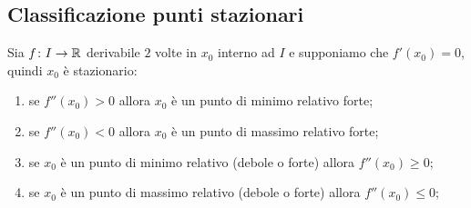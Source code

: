 \documentclass[a4paper]{article}
\begin{document}

\subsection{Classificazione punti stazionari}

\begin{snippettheorem}{}
    Sia \(f\colon I \to \mathbb{R}\) derivabile \(2\) volte in \(x_0\) interno ad \(I\)
    e supponiamo che \(f'(x_0) = 0\), quindi \(x_0\) è stazionario:
    \begin{enumerate}
        \item se \(f''(x_0) > 0\) allora \(x_0\) è un punto di minimo relativo forte;
        \item se \(f''(x_0) < 0\) allora \(x_0\) è un punto di massimo relativo forte;
        \item se \(x_0\) è un punto di minimo relativo (debole o forte) allora \(f''(x_0) \geq 0\);
        \item se \(x_0\) è un punto di massimo relativo (debole o forte) allora \(f''(x_0) \leq 0\);
    \end{enumerate}
\end{snippettheorem}
\end{document}
